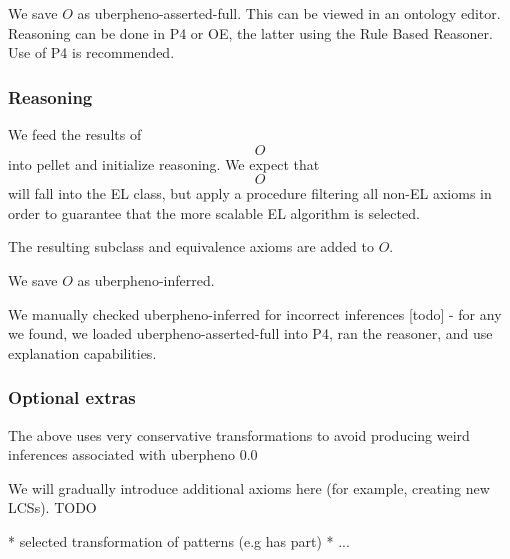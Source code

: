 We save $O$ as uberpheno-asserted-full. This can be viewed in an
ontology editor. Reasoning can be done in P4 or OE, the latter using
the Rule Based Reasoner. Use of P4 is recommended.

\subsubsection{Reasoning}

We feed the results of $$O$$ into pellet and initialize reasoning. We
expect that $$O$$ will fall into the EL class, but apply a procedure
filtering all non-EL axioms in order to guarantee that the more
scalable EL algorithm is selected.

The resulting subclass and equivalence axioms are added to $O$.

We save $O$ as uberpheno-inferred.

We manually checked uberpheno-inferred for incorrect inferences [todo]
- for any we found, we loaded uberpheno-asserted-full into P4, ran the
reasoner, and use explanation capabilities.

\subsubsection{Optional extras}

The above uses very conservative transformations to avoid producing
weird inferences associated with uberpheno 0.0

We will gradually introduce additional axioms here (for example,
creating new LCSs). TODO

* selected transformation of patterns (e.g has part)
* ...








